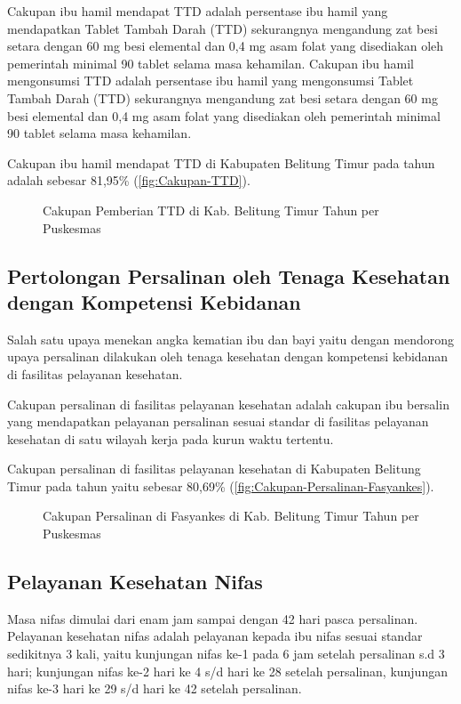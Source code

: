 Cakupan ibu hamil mendapat TTD adalah persentase ibu hamil yang mendapatkan Tablet Tambah Darah (TTD) sekurangnya mengandung zat besi setara dengan 60 mg besi elemental dan 0,4 mg asam folat yang disediakan oleh pemerintah minimal 90 tablet selama masa kehamilan. Cakupan ibu hamil mengonsumsi TTD adalah persentase ibu hamil yang mengonsumsi Tablet Tambah Darah (TTD) sekurangnya mengandung zat besi setara dengan 60 mg besi elemental dan 0,4 mg asam folat yang disediakan oleh pemerintah minimal 90 tablet selama masa kehamilan.

Cakupan ibu hamil mendapat TTD di Kabupaten Belitung Timur pada tahun \tP adalah sebesar 81,95\% (\autoref{fig:Cakupan-TTD}).

\begin{figure}[H]
    \centering
    \caption{Cakupan Pemberian TTD di Kab. Belitung Timur Tahun \tP per Puskesmas}
    \label{fig:Cakupan-TTD}
\end{figure}


\subsection{Pertolongan Persalinan oleh Tenaga Kesehatan dengan Kompetensi Kebidanan}
Salah satu upaya menekan angka kematian ibu dan bayi yaitu dengan mendorong upaya persalinan dilakukan oleh tenaga kesehatan dengan kompetensi kebidanan di fasilitas pelayanan kesehatan.

Cakupan persalinan di fasilitas pelayanan kesehatan adalah cakupan ibu bersalin yang mendapatkan pelayanan persalinan sesuai standar di fasilitas pelayanan kesehatan di satu wilayah kerja pada kurun waktu tertentu.

Cakupan persalinan di fasilitas pelayanan kesehatan di Kabupaten Belitung Timur pada tahun \tP yaitu sebesar 80,69\% (\autoref{fig:Cakupan-Persalinan-Fasyankes}).

\begin{figure}[H]
    \centering
    \caption{Cakupan Persalinan di Fasyankes di Kab. Belitung Timur Tahun \tP per Puskesmas}
    \label{fig:Cakupan-Persalinan-Fasyankes}
\end{figure}

\subsection{Pelayanan Kesehatan Nifas}
Masa nifas dimulai dari enam jam sampai dengan 42 hari pasca persalinan.
Pelayanan kesehatan nifas adalah pelayanan kepada ibu nifas sesuai standar sedikitnya 3 kali, yaitu kunjungan nifas ke-1 pada 6 jam setelah persalinan s.d 3 hari; kunjungan nifas ke-2 hari ke 4 s/d hari ke 28 setelah persalinan, kunjungan nifas ke-3 hari ke 29 s/d hari ke 42 setelah persalinan.

